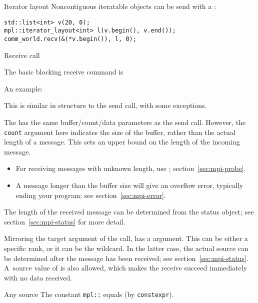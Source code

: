 \begin{mplnote}{Iterator layout}
  Noncontiguous iteratable objects can be send with a
  :
\begin{lstlisting}
std::list<int> v(20, 0);
mpl::iterator_layout<int> l(v.begin(), v.end());
comm_world.recv(&(*v.begin()), l, 0);  
\end{lstlisting}
\end{mplnote}

 {Receive call}

The basic blocking receive command is
%

An example:
%

This is similar in structure to the send call, with some exceptions.

The  has the same buffer/count/data parameters as the send
call.
However, 
the \lstinline{count} argument here indicates the size of the buffer,
rather than the actual length of a message.
This sets an upper bound on the length of the incoming message.
\begin{itemize}
\item For receiving messages with unknown length, use ;
  section~\ref{sec:mpi-probe}.
\item A message longer than the buffer size will give an overflow error,
  typically ending your program; see section~\ref{sec:mpi-error}.
\end{itemize}
The length of the received message can be determined 
from the status object; see section~\ref{sec:mpi-status} for more detail.

Mirroring the target argument of the  call,
 has a 
argument.
This can be either a specific rank, or it can be the
 wildcard. In the latter case, the actual
source can be determined after the message has been received;
see section~\ref{sec:mpi-status}.
A~source value of  is also allowed,
which makes the receive succeed immediately with no data received.

\begin{mplnote}{Any source}
  The constant \lstinline+mpl::+
  equals  (by \lstinline+constexpr+).
\end{mplnote}


